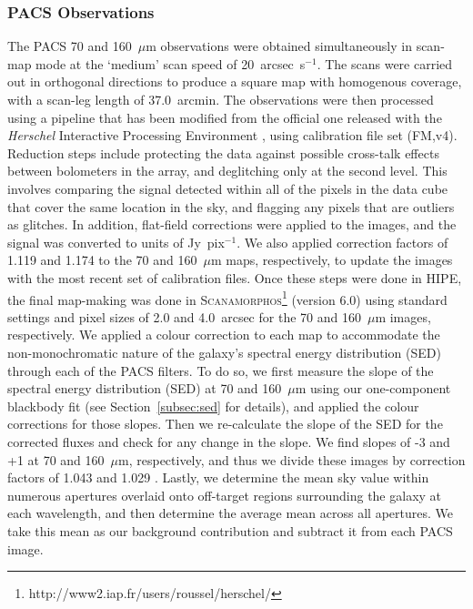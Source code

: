 \documentclass[useAMS,usenatbib,usegraphicx]{mn2e}
\begin{document}
\subsubsection{PACS Observations}\label{subsubsec:PACS}
The PACS 70 and 160~$\mu$m observations were obtained simultaneously in scan-map mode at the `medium' scan speed of 20~arcsec~s$^{-1}$.  The scans were carried out in orthogonal directions to produce a square map with homogenous coverage, with a scan-leg length of 37.0~arcmin.  The observations were then processed using a pipeline that has been modified from the official one released with the \emph{Herschel} Interactive Processing Environment \citep[HIPE, version 4.0;][]{2010ASPC..434..139O}, using calibration file set (FM,v4).  Reduction steps include protecting the data against possible cross-talk effects between bolometers in the array, and deglitching only at the second level.  This involves comparing the signal detected within all of the pixels in the data cube that cover the same location in the sky, and flagging any pixels that are outliers as glitches.  In addition, flat-field corrections were applied to the images, and the signal was converted to units of Jy~pix$^{-1}$.  We also applied correction factors of 1.119 and 1.174 to the 70 and 160~$\mu$m maps, respectively, to update the images with the most recent set of calibration files.  Once these steps were done in HIPE, the final map-making was done in \textsc{Scanamorphos}\footnote{http://www2.iap.fr/users/roussel/herschel/} (version 6.0) \citep{Roussel_2011_submit} using standard settings and pixel sizes of 2.0 and 4.0~arcsec for the 70 and 160~$\mu$m images, respectively.  We applied a colour correction to each map to accommodate the non-monochromatic nature of the galaxy's spectral energy distribution (SED) through each of the PACS filters.  To do so, we first measure the slope of the spectral energy distribution (SED) at 70 and 160~$\mu$m using our one-component blackbody fit (see Section~\ref{subsec:sed} for details), and applied the colour corrections for those slopes.  Then we re-calculate the slope of the SED for the corrected fluxes and check for any change in the slope.  We find slopes of -3 and +1 at 70 and 160~$\mu$m, respectively, and thus we divide these images by correction factors of 1.043 and 1.029 \citep{PACS_cc_2011}.  Lastly, we determine the mean sky value within numerous apertures overlaid onto off-target regions surrounding the galaxy at each wavelength, and then determine the average mean across all apertures.  We take this mean as our background contribution and subtract it from each PACS image.
\end{document}
